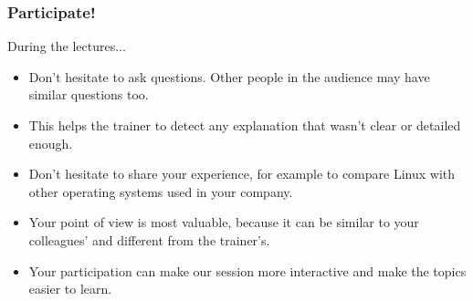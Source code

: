 \begin{frame}
\frametitle{Participate!}
During the lectures...
\begin{itemize}
\item Don't hesitate to ask questions. Other people in the audience may have
similar questions too.
\item This helps the trainer to detect any explanation that wasn't clear or
detailed enough.
\item Don't hesitate to share your experience, for example to compare Linux
with other operating systems used in your company.
\item Your point of view is most valuable, because it can be similar to your
colleagues' and different from the trainer's.
\item Your participation can make our session more interactive and make the
topics easier to learn.
\end{itemize}
\end{frame}

